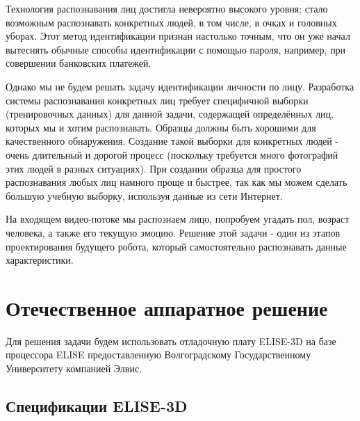 \documentclass[14pt,a4paper]{scrartcl}
\begin{document}
			Технология распознавания лиц достигла невероятно высокого уровня: стало возможным распознавать конкретных людей, в том числе, в очках и головных уборах. Этот метод идентификации признан настолько точным, что он уже начал вытеснять обычные способы идентификации с помощью пароля, например, при совершении банковских платежей\cite{bib:Smart_Payment_China}. 
			
			Однако мы не будем решать задачу идентификации личности по лицу. Разработка системы распознавания конкретных лиц требует специфичной выборки (тренировочных данных) для данной задачи, содержащей определённых лиц, которых мы и хотим распознавать. Образцы должны быть хорошими для качественного обнаружения. Создание такой выборки для конкретных людей - очень длительный и дорогой процесс (поскольку требуется много фотографий этих людей в разных ситуациях). При создании образца для простого распознавания любых лиц намного проще и быстрее, так как мы можем сделать большую учебную выборку, используя данные из сети Интернет.
			
			На входящем видео-потоке мы распознаем лицо, попробуем угадать пол, возраст человека, а также его текущую эмоцию. Решение этой задачи - один из этапов проектирования будущего робота, который самостоятельно распознавать данные характеристики\cite{bib:Elise_CPU_Desc}.
		
		

\section{Отечественное аппаратное решение}

	Для  решения задачи будем использовать отладочную плату ELISE-3D на базе процессора ELISE предоставленную Волгоградскому Государственному Университету компанией Элвис.
	
	\subsection{Спецификации ELISE-3D}
	
\end{document}
